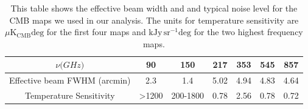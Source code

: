 \documentclass{princeton_astro_thesis}
\begin{document}


\begin{table}[h!]
\centering
\begin{tabular}{||c c c c c c c||} 
 \hline
$\nu \mathrm(GHz)$ & 90 & 150 & 217 & 353 & 545 & 857 \\ [0.5ex] 
 \hline\hline  %
Effective beam FWHM (arcmin) & 2.3 & 1.4 & 5.02 &  4.94 &  4.83 &  4.64\\[0.25 cm] 
Temperature Sensitivity & >1200 & 200-1800 & 0.78 & 2.56 & 0.78 & 0.72\\ [1ex] 
 \hline
\end{tabular}
\caption{This table shows the effective beam width and and typical noise level for the CMB maps we used in our analysis. The units for temperature sensitivity are $\mu \mathrm{K_{CMB} deg}$ for the first four maps and $\mathrm{kJy\, sr^{-1} deg}$ for the two highest frequency maps.}
\label{table:1}
\end{table}
\end{document}
